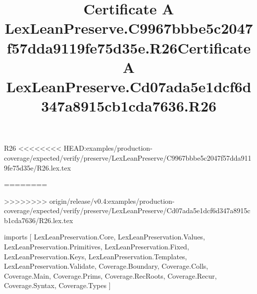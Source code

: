 \begin{lexlean}{R26}
<<<<<<<< HEAD:examples/production-coverage/expected/verify/preserve/LexLeanPreserve/C9967bbbe5c2047f57dda9119fe75d35e/R26.lex.tex
\title{Certificate A LexLeanPreserve.C9967bbbe5c2047f57dda9119fe75d35e.R26}
========
\title{Certificate A LexLeanPreserve.Cd07ada5e1dcf6d347a8915cb1cda7636.R26}
>>>>>>>> origin/release/v0.4:examples/production-coverage/expected/verify/preserve/LexLeanPreserve/Cd07ada5e1dcf6d347a8915cb1cda7636/R26.lex.tex
\begin{coremodule}
imports [
  LexLeanPreservation.Core,
  LexLeanPreservation.Values,
  LexLeanPreservation.Primitives,
  LexLeanPreservation.Fixed,
  LexLeanPreservation.Keys,
  LexLeanPreservation.Templates,
  LexLeanPreservation.Validate,
  Coverage.Boundary,
  Coverage.Colls,
  Coverage.Main,
  Coverage.Prims,
  Coverage.RecRoots,
  Coverage.Recur,
  Coverage.Syntax,
  Coverage.Types
]


\end{coremodule}
\end{lexlean}
